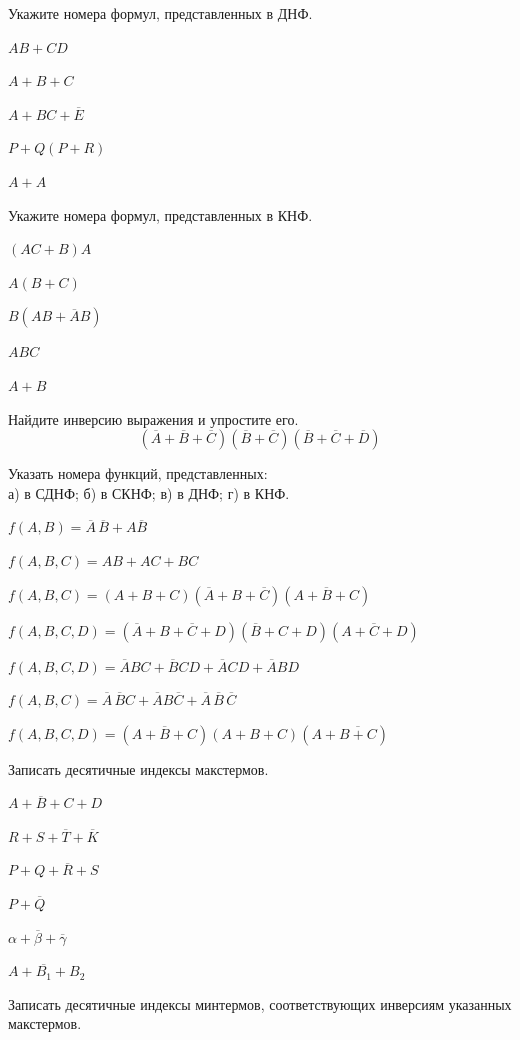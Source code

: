 \documentclass[a4paper,12pt,oneside]{article}
\begin{document}

Укажите номера формул, представленных в ДНФ.
\begin{numlist}
    \item $AB+CD$
    \item $A+B+C$
    \item $A+BC+\overline{E}$
    \item $P+Q(P+R)$
    \item $A+A$
\end{numlist}

Укажите номера формул, представленных в КНФ.
\begin{numlist}
    \item $(AC+B)A$
    \item $A(B+C)$
    \item $B(AB+\overline{A}B)$
    \item $ABC$
    \item $A+B$
\end{numlist}

Найдите инверсию выражения и упростите его.
\[
(\overline{A}+\overline{B}+\overline{C})(\overline{B}+\overline{C})(\overline{B}+\overline{C}+\overline{D})
\]

Указать номера функций, представленных:\\ а) в СДНФ; б) в СКНФ; в) в ДНФ; г) в КНФ.
\begin{numlist}
    \item $f(A,B)=\overline{A}\,\overline{B}+A\overline{B}$
    \item $f(A,B,C)=AB+AC+BC$
    \item $f(A,B,C)=(A+B+C)(\overline{A}+B+\overline{C})(A+\overline{B}+C)$
    \item $f(A,B,C,D)=(\overline{A}+B+\overline{C}+D)(\overline{B}+C+D)(A+\overline{C}+D)$
    \item $f(A,B,C,D)=\overline{A}BC+\overline{B}CD+\overline{A}CD+\overline{A}BD$
    \item $f(A,B,C)=\overline{A}\,\overline{B}C+\overline{A}B\overline{C}+\overline{A}\,\overline{B}\,\overline{C}$
    \item $f(A,B,C,D)=(A+\overline{B}+C)(A+B+C)(A+\overline{B+C})$
\end{numlist}

Записать десятичные индексы макстермов.
\begin{numlist}
    \item $A+\overline{B}+C+D$
    \item $R+S+\overline{T}+\overline{K}$
    \item $P+Q+\overline{R}+S$
    \item $P+\overline{Q}$
    \item $\alpha+\overline{\beta}+\overline{\gamma}$
    \item $A+\overline{B_1}+B_2$
\end{numlist}
Записать десятичные индексы минтермов, соответствующих инверсиям указанных макстермов.
\end{document}
